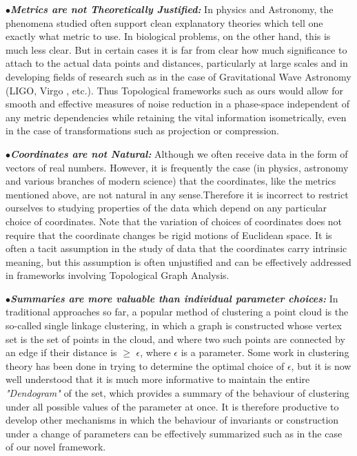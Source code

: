 $\bullet$\textbf{\textit{Metrics are not Theoretically Justified:}} In physics and Astronomy, the phenomena studied often support clean explanatory theories which tell one exactly what metric to use. In biological problems, on the other hand, this is much less clear. But in certain cases it is far from clear how much significance to attach to the actual data points and distances, particularly at large scales and in developing fields of research such as in the case of Gravitational Wave Astronomy (LIGO, Virgo , etc.). Thus Topological frameworks such as ours would allow for smooth and effective measures of noise reduction in a phase-space independent of any metric dependencies while retaining the vital information isometrically, even in the case of transformations such as projection or compression.

$\bullet$\textbf{\textit{Coordinates are not Natural:}} Although we often receive data in the form of vectors of real numbers. However, it is frequently the case (in physics, astronomy and various branches of modern science) that the coordinates, like the metrics mentioned above, are not natural in any sense.Therefore it is incorrect to restrict ourselves to studying properties of the data which depend on any particular choice of coordinates. Note that the variation of choices of coordinates does not require that the coordinate changes be rigid motions of Euclidean space. It is often a tacit assumption in the study of data that the coordinates carry intrinsic meaning, but this assumption is often unjustified \cite{01_GCarlssonEpstein2011} \cite{02.1_GCarlson2004topoEstimation} \cite{02_carlsson2009topology} and can be effectively addressed in frameworks involving Topological Graph Analysis.

$\bullet$\textbf{\textit{Summaries are more valuable than individual parameter choices:}} In traditional approaches so far, a popular method of clustering a point cloud is the so-called single linkage clustering,  in which a graph is constructed whose vertex set is the set of points in the cloud, and where two such points are connected by an edge if their distance is  $\ge$ $\epsilon$, where $\epsilon$ is a parameter. \cite{02_carlsson2009topology} \cite{02.6_2009TDAChallenges} Some work in clustering theory has been done in trying to determine the optimal choice of $\epsilon$, but it is now well understood that it is much more informative to maintain the entire \textit{"Dendogram"} \cite{20.1_2001DAGMechanics}\cite{20.0_2013AlgebraOfDAGs} of the set, which provides a summary of the
behaviour of clustering under all possible values of the parameter  at once. It is therefore productive to develop other mechanisms in which the behaviour of invariants or construction under a change of parameters can be effectively summarized such as in the case of our novel framework.

